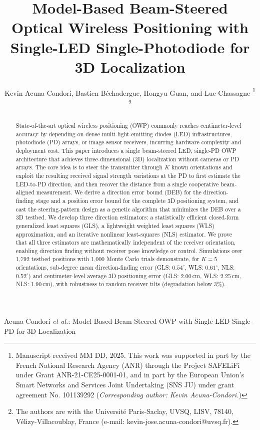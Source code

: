 \documentclass[journal]{IEEEtran}
\newcommand{\added}[1]{{\color{blue}#1}}
\begin{document}

\title{Model-Based Beam-Steered Optical Wireless Positioning with Single-LED Single-Photodiode for 3D Localization}
\author{Kevin Acuna-Condori, Bastien Béchadergue, Hongyu Guan, and Luc Chassagne
\thanks{Manuscript received MM DD, 2025.
This work was supported in part by the French National Research Agency (ANR) through the Project SAFELiFi under Grant ANR-21-CE25-0001-01, and in part by the European Union's Smart Networks and Services Joint Undertaking (SNS JU) under grant agreement No. 101139292 (\textit{Corresponding author: Kevin Acuna-Condori.})
}
\thanks{
The authors are with the Université Paris-Saclay, UVSQ, LISV, 78140, Vélizy-Villacoublay, France (e-mail: kevin-jose.acuna-condori@uvsq.fr).
}
}
%
{Acuna-Condori \MakeLowercase{\textit{et al.}}: Model-Based Beam-Steered OWP with Single-LED Single-PD for 3D Localization}
\maketitle

\begin{abstract}
State-of-the-art optical wireless positioning (OWP) commonly reaches centimeter-level accuracy by depending on dense multi-light-emitting diodes (LED) infrastructures, photodiode (PD) arrays, or image-sensor receivers, incurring hardware complexity and deployment cost. 
\added{This paper introduces a single beam-steered LED, single-PD OWP architecture that achieves three-dimensional (3D) localization without cameras or PD arrays. The core idea is to steer the transmitter through $K$ known orientations and exploit the resulting received signal strength variations at the PD to first estimate the LED-to-PD direction, and then recover the distance from a single cooperative beam-aligned measurement. We derive a direction error bound (DEB) for the direction-finding stage and a position error bound for the complete 3D positioning system, and cast the steering-pattern design as a genetic algorithm that minimizes the DEB over a 3D testbed. We develop three direction estimators: a statistically efficient closed-form generalized least squares (GLS), a lightweight weighted least squares (WLS) approximation, and an iterative nonlinear least-squares (NLS) estimator. We prove that all three estimators are mathematically independent of the receiver orientation, enabling direction finding without receiver pose knowledge or control. Simulations over 1,792 testbed positions with 1,000 Monte Carlo trials demonstrate, for $K=5$ orientations, sub-degree mean direction-finding error (GLS: $0.54^\circ$, WLS: $0.61^\circ$, NLS: $0.52^\circ$) and centimeter-level average 3D positioning error (GLS: 2.00\,cm, WLS: 2.25\,cm, NLS: 1.90\,cm), with robustness to random receiver tilts (degradation below 3\%).}
\end{abstract}
\end{document}
